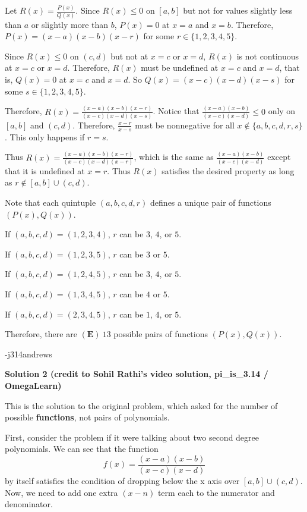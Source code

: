 \begin{enumerate}
 Let $R(x) = \frac{P(x)}{Q(x)}$.  Since $R(x) \leq 0$ on $[a, b]$ but not for values slightly less than $a$ or slightly more than $b$, $P(x) = 0$ at $x = a$ and $x = b$.  Therefore, $P(x) = (x-a)(x-b)(x-r)$ for some $r \in \{1, 2, 3, 4, 5\}$.

 Since $R(x) \leq 0$ on $(c, d)$ but not at $x = c$ or $x = d$, $R(x)$ is not continuous at $x = c$ or $x = d$.  Therefore, $R(x)$ must be undefined at $x = c$ and $x = d$, that is, $Q(x) = 0$ at $x = c$ and $x = d$.  So $Q(x) = (x-c)(x-d)(x-s)$ for some $s \in \{1, 2, 3, 4, 5\}$. 

 Therefore, $R(x) = \frac{(x-a)(x-b)(x-r)}{(x-c)(x-d)(x-s)}$.  Notice that $\frac{(x-a)(x-b)}{(x-c)(x-d)} \leq 0$ only on $[a, b]$ and $(c, d)$.  Therefore, $\frac{x-r}{x-s}$ must be nonnegative for all $x \notin \{a, b, c, d, r, s\}$.  This only happens if $r = s$.

 Thus $R(x) = \frac{(x-a)(x-b)(x-r)}{(x-c)(x-d)(x-r)}$, which is the same as $\frac{(x-a)(x-b)}{(x-c)(x-d)}$ except that it is undefined at $x = r$.  Thus $R(x)$ satisfies the desired property as long as $r \notin [a, b] \cup (c, d)$.

 Note that each quintuple $(a, b, c, d, r)$ defines a unique pair of functions $(P(x), Q(x))$.

 If $(a, b, c, d) = (1, 2, 3, 4)$, $r$ can be $3$, $4$, or $5$.

 If $(a, b, c, d) = (1, 2, 3, 5)$, $r$ can be $3$ or $5$.

 If $(a, b, c, d) = (1, 2, 4, 5)$, $r$ can be $3$, $4$, or $5$.

 If $(a, b, c, d) = (1, 3, 4, 5)$, $r$ can be $4$ or $5$.

 If $(a, b, c, d) = (2, 3, 4, 5)$, $r$ can be $1$, $4$, or $5$.

 Therefore, there are $\boxed{(\textbf{E})\ 13}$ possible pairs of functions $(P(x), Q(x))$.

 -j314andrews

 



\textbf{Solution 2 (credit to Sohil Rathi's video solution, pi_is_3.14 / OmegaLearn)}

This is the solution to the original problem, which asked for the number of possible \textbf{functions}, not pairs of polynomials. 

 First, consider the problem if it were talking about two second degree polynomials. We can see that the function 
 \[f(x) = \frac{(x-a)(x-b)}{(x-c)(x-d)}\] by itself satisfies the condition of dropping below the x axis over $[a,b] \cup (c,d).$ Now, we need to add one extra $(x-n)$ term each to the numerator and denominator. 


\end{enumerate}
